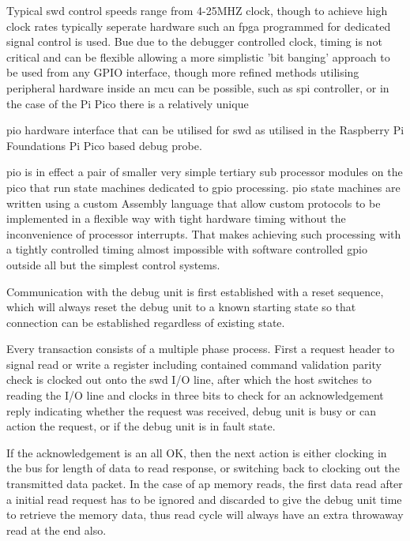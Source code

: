 Typical \gls{swd} control speeds range from 4-25MHZ clock, though to achieve high clock rates typically seperate hardware such an \gls{fpga} programmed for dedicated signal control is used. Bue due to the debugger controlled clock, timing is not critical and can be flexible allowing a more simplistic 'bit banging' approach to be used from any GPIO interface, though more refined methods utilising peripheral hardware inside an \gls{mcu} can be possible, such as \gls{spi} controller, or in the case of the Pi Pico there is a relatively unique {\gls{pio} hardware interface that can be utilised for \gls{swd} as utilised in the Raspberry Pi Foundations Pi Pico based debug probe.

\gls{pio} is in effect a pair of smaller very simple tertiary sub processor modules on the pico that run state machines dedicated to \gls{gpio} processing. \gls{pio} state machines are written using a custom Assembly language that allow custom protocols to be implemented in a flexible way with tight hardware timing without the inconvenience of processor interrupts. That makes achieving such processing with a tightly controlled timing almost impossible with software controlled \gls{gpio} outside all but the simplest control systems.


Communication with the debug unit is first established with a reset sequence, which will always reset the debug unit to a known starting state so that connection can be established regardless of existing state.

Every transaction consists of a multiple phase process. First a request header to signal read or write a register including contained command validation parity check is clocked out onto the \gls{swd} I/O line, after which the host switches to reading the I/O line and clocks in three bits to check for an acknowledgement reply indicating whether the request was received, debug unit is busy or can action the request, or if the debug unit is in fault state.

If the acknowledgement is an all OK, then the next action is either clocking in the bus for length of data to read response, or switching back to clocking out the transmitted data packet. In the case of \gls{ap} memory reads, the first data read after a initial read request has to be ignored and discarded to give the debug unit time to retrieve the memory data, thus read cycle will always have an extra throwaway read at the end also.

}
